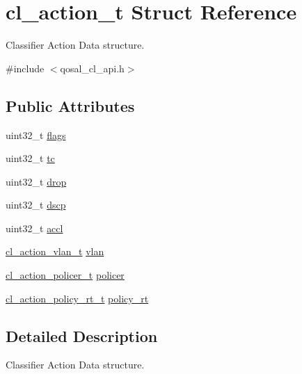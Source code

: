 \hypertarget{structcl__action__t}{\section{cl\-\_\-action\-\_\-t Struct Reference}
\label{structcl__action__t}
}


Classifier Action Data structure.  




{\ttfamily \#include $<$qosal\-\_\-cl\-\_\-api.\-h$>$}

\subsection*{Public Attributes}
\begin{DoxyCompactItemize}
\item 
uint32\-\_\-t \hyperlink{structcl__action__t_a0ef7b8638843204cfa3dd74c26ab20a0}{flags}
\item 
uint32\-\_\-t \hyperlink{structcl__action__t_ad988ca7593a7db02a0336ca43823e713}{tc}
\item 
uint32\-\_\-t \hyperlink{structcl__action__t_a38aa686bf4ea526cd44a6956b95391ff}{drop}
\item 
uint32\-\_\-t \hyperlink{structcl__action__t_ad1d7d787f8308358001d3e7a7a38e569}{dscp}
\item 
uint32\-\_\-t \hyperlink{structcl__action__t_a0be5ab503978c3b1df4db2e0bb6cfa3e}{accl}
\item 
\hyperlink{structcl__action__vlan__t}{cl\-\_\-action\-\_\-vlan\-\_\-t} \hyperlink{structcl__action__t_a68aff443f2f8b721c811659a53ab81a2}{vlan}
\item 
\hyperlink{structcl__action__policer__t}{cl\-\_\-action\-\_\-policer\-\_\-t} \hyperlink{structcl__action__t_a9a133ee1bbff2b44eb4cf39b5fd47950}{policer}
\item 
\hyperlink{structcl__action__policy__rt__t}{cl\-\_\-action\-\_\-policy\-\_\-rt\-\_\-t} \hyperlink{structcl__action__t_a99f7a05dd6c2ea8da703b93d501c8808}{policy\-\_\-rt}
\end{DoxyCompactItemize}


\subsection{Detailed Description}
Classifier Action Data structure. 

